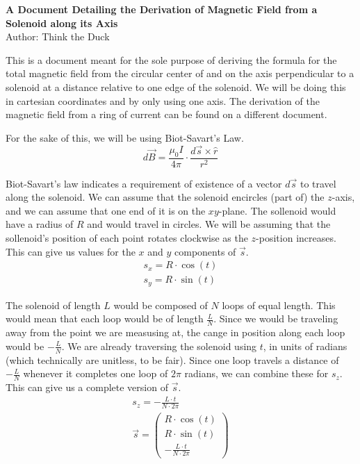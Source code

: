 \documentclass[12pt]{article}
\begin{document}
    \begin{center}
        \textbf{A Document Detailing the Derivation of Magnetic Field from a Solenoid along its Axis}\\
        Author: Think the Duck
    \end{center}
    This is a document meant for the sole purpose of deriving the formula for the total magnetic field from the circular center of and on the axis perpendicular to a solenoid at a distance relative to one edge of the solenoid.
    We will be doing this in cartesian coordinates and by only using one axis.
    The derivation of the magnetic field from a ring of current can be found on a different document.

    For the sake of this, we will be using Biot-Savart's Law.
    \begin{equation}
        d\vec{B} = \frac{\mu_0 I}{4\pi} \cdot \frac{d\vec{s} \times \hat{r}}{r^2}
    \end{equation}

    Biot-Savart's law indicates a requirement of existence of a vector $d\vec{s}$ to travel along the solenoid.
    We can assume that the solenoid encircles (part of) the $z$-axis, and we can assume that one end of it is on the $xy$-plane. 
    The sollenoid would have a radius of $R$ and would travel in circles.
    We will be assuming that the sollenoid's position of each point rotates clockwise as the $z$-position increases.
    This can give us values for the $x$ and $y$ components of $\vec{s}$.
    \begin{gather}
        s_x = R \cdot \cos(t)\\
        s_y = R \cdot \sin(t)
    \end{gather}

    The solenoid of length $L$ would be composed of $N$ loops of equal length.
    This would mean that each loop would be of length $\frac{L}{N}$.
    Since we would be traveling away from the point we are measusing at, the cange in position along each loop would be $-\frac{L}{N}$.
    We are already traversing the solenoid using $t$, in units of radians (which technically are unitless, to be fair).
    Since one loop travels a distance of $-\frac{L}{N}$ whenever it completes one loop of $2\pi$ radians, we can combine these for $s_z$.
    This can give us a complete version of $\vec{s}$.
    \begin{gather}
        s_z = -\frac{L \cdot t}{N \cdot 2\pi}\\
        \vec{s} =   \begin{pmatrix}
            R \cdot \cos(t)\\
            R \cdot \sin(t)\\
            -\frac{L \cdot t}{N \cdot 2\pi}
        \end{pmatrix}
    \end{gather}
\end{document}
